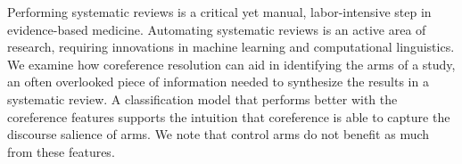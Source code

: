 Performing systematic reviews is a critical yet manual, labor-intensive step in evidence-based medicine. Automating systematic reviews is an active area of research, requiring innovations in machine learning and computational linguistics. We examine how coreference resolution can aid in identifying the arms of a study, an often overlooked piece of information needed to synthesize the results in a systematic review. A classification model that performs better with the coreference features supports the intuition that coreference is able to capture the discourse salience of arms. We note that control arms do not benefit as much from these features.
